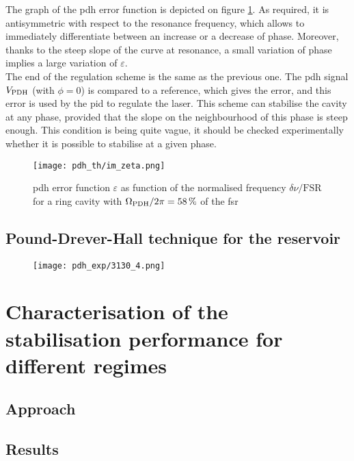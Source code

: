 The graph of the \gls{pdh} error function is depicted on figure \ref{im_zeta}. As required, it is antisymmetric with respect to the resonance frequency, which allows to immediately differentiate between an increase or a decrease of phase. Moreover, thanks to the steep slope of the curve at resonance, a small variation of phase implies a large variation of $\varepsilon$.\\

The end of the regulation scheme is the same as the previous one. The \gls{pdh} signal $V_{\text{PDH}}$ (with $\phi=0$) is compared to a reference, which gives the error, and this error is used by the \gls{pid} to regulate the laser. This scheme can stabilise the cavity at any phase, provided that the slope on the neighbourhood of this phase is steep enough. This condition is being quite vague, it should be checked experimentally whether it is possible to stabilise at a given phase.\\

\begin{figure}
	\centering
	\texttt{[image: pdh\_th/im\_zeta.png]}
	\caption{\gls{pdh} error function $\varepsilon$ as function of the normalised frequency $\delta \nu /\text{FSR}$ for a ring cavity with $\Omega_{\text{PDH}}/2\pi=\SI{58}{\percent}$ of the \gls{fsr}}
	\label{im_zeta}
\end{figure}


\subsection{Pound-Drever-Hall technique for the reservoir}

\begin{figure}
	\centering
	\texttt{[image: pdh\_exp/3130\_4.png]}
\end{figure}


\section{Characterisation of the stabilisation performance for different regimes}


\subsection{Approach}



\subsection{Results}